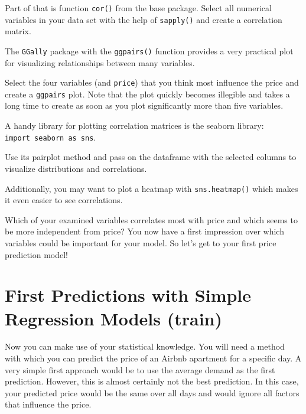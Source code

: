 \documentclass[
  11pt,
]{book}
\newenvironment{tips}[1]
  {
  \begin{itemize}
  \footnotesize
  \renewcommand{\labelitemi}{
    \raisebox{-.7\height}[0pt][0pt]{
      {\setkeys{Gin}{width=3em,keepaspectratio}
        \texttt{[image: images/\#1.png]}}
    }
  }
  \setlength{\fboxsep}{1em}
  \begin{rbox}
  \item
  }
  {
  \end{rbox}
  \end{itemize}
  }
\newenvironment{tipsp}[1]
  {
  \begin{itemize}
  \footnotesize
  \renewcommand{\labelitemi}{
    \raisebox{-.7\height}[0pt][0pt]{
      {\setkeys{Gin}{width=3em,keepaspectratio}
        \texttt{[image: images/\#1.png]}}
    }
  }
  \setlength{\fboxsep}{1em}
  \begin{pbox}
  \item
  }
  {
  \end{pbox}
  \end{itemize}
  }
\begin{document}
\begin{tips}r

Part of that is function \texttt{cor()} from the base package. Select all numerical variables in your data set with the help of \texttt{sapply()} and create a correlation matrix.

The \texttt{GGally} package with the \texttt{ggpairs()} function provides a very practical plot for visualizing relationships between many variables.

Select the four variables (and \texttt{price}) that you think most influence the price and create a \texttt{ggpairs} plot. Note that the plot quickly becomes illegible and takes a long time to create as soon as you plot significantly more than five variables.

\end{tips}

\begin{tipsp}p

A handy library for plotting correlation matrices is the seaborn library: \texttt{import\ seaborn\ as\ sns}.

Use its pairplot method and pass on the dataframe with the selected columns to visualize distributions and correlations.

Additionally, you may want to plot a heatmap with \texttt{sns.heatmap()} which makes it even easier to see correlations.

\end{tipsp}

Which of your examined variables correlates most with price and which seems to be more independent from price? You now have a first impression over which variables could be important for your model. So let's get to your first price prediction model!

\hypertarget{first-predictions-with-simple-regression-models-train}{%
\section{First Predictions with Simple Regression Models (train)}\label{first-predictions-with-simple-regression-models-train}}

Now you can make use of your statistical knowledge. You will need a method with which you can predict the price of an Airbnb apartment for a specific day. A very simple first approach would be to use the average demand as the first prediction. However, this is almost certainly not the best prediction. In this case, your predicted price would be the same over all days and would ignore all factors that influence the price.
\end{document}
